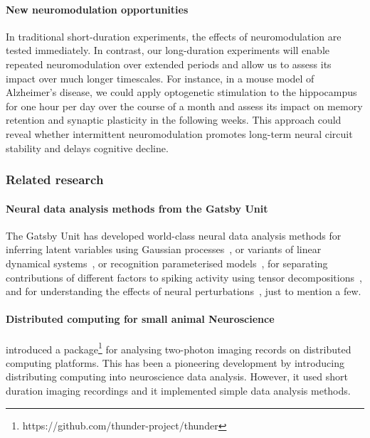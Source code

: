 \documentclass[12pt]{article}
\begin{document}
\paragraph{New neuromodulation opportunities}
%
In traditional short-duration experiments, the effects of neuromodulation are
tested immediately. In contrast, our long-duration experiments will enable
repeated neuromodulation over extended periods and allow us to assess its
impact over much longer timescales.
%
For instance, in a mouse model of Alzheimer's disease, we could apply
optogenetic stimulation to the hippocampus for one hour per day over the course
of a month and assess its impact on memory retention and synaptic plasticity in
the following weeks. This approach could reveal whether intermittent
neuromodulation promotes long-term neural circuit stability and delays
cognitive decline.

\subsubsection{Related research}
\label{sec:relatedResearchOfflineAnalysis}

\paragraph{Neural data analysis methods from the Gatsby Unit}
%
The Gatsby Unit has developed world-class neural data analysis methods for
%
inferring latent variables using Gaussian
processes~\citep{yuEtAl09,dunckerAndSahani18,ruttenEtAl20,yuEtAl24}, or variants
of linear dynamical systems~\citep{buesinEtAl12,mackeEtAl15}, or recognition
parameterised models~\citep{walkerEtAl23},
%
for separating contributions of different factors to spiking activity using
tensor decompositions~\citep{soulatEtAl21},
%
and for understanding the effects of neural perturbations~\citep{oSheaEtAl22},
just to mention a few.

\paragraph{Distributed computing for small animal Neuroscience}
%
\citet{freemanEtAl14} introduced a
package\footnote{https://github.com/thunder-project/thunder} for analysing
two-photon imaging records on distributed computing platforms.  This has been a
pioneering development by introducing distributing computing into neuroscience
data analysis. However, it used short duration imaging recordings and it
implemented simple data analysis methods.
\end{document}
